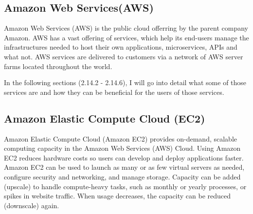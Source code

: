 	\subsection{Amazon Web Services(AWS)}
		Amazon Web Services (AWS) is the public cloud offerring by the parent company Amazon. AWS has a vast offering
		of services, which help its end-users manage the infrastructures needed to host their own applications, 
		microservices, APIs and what not.
		AWS services are delivered to customers via a network of AWS server farms located throughout the world.

		In the following sections (2.14.2 - 2.14.6), I will go into detail what some of those services are and how
		they can be beneficial for the users of those services.

	\subsection{Amazon Elastic Compute Cloud (EC2)}
		Amazon Elastic Compute Cloud (Amazon EC2) \cite{ec2} provides on-demand, scalable computing capacity in the Amazon 
		Web Services (AWS) Cloud. Using Amazon EC2 reduces hardware costs so users can develop and deploy applications faster. 
		Amazon EC2 can be used to launch as many or as few virtual servers as needed, configure security and networking, 
		and manage storage. Capacity can be added (upscale) to handle compute-heavy tasks, such as monthly or yearly processes,
		or spikes in website traffic. When usage decreases, the capacity can be reduced (downscale) again.

